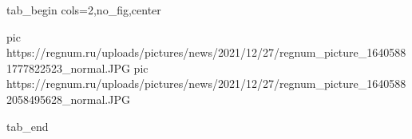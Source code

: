  
 
 
 
 


\ifcmt
  tab_begin cols=2,no_fig,center

     pic https://regnum.ru/uploads/pictures/news/2021/12/27/regnum_picture_16405881777822523_normal.JPG
		 pic https://regnum.ru/uploads/pictures/news/2021/12/27/regnum_picture_16405882058495628_normal.JPG

  tab_end
\fi
